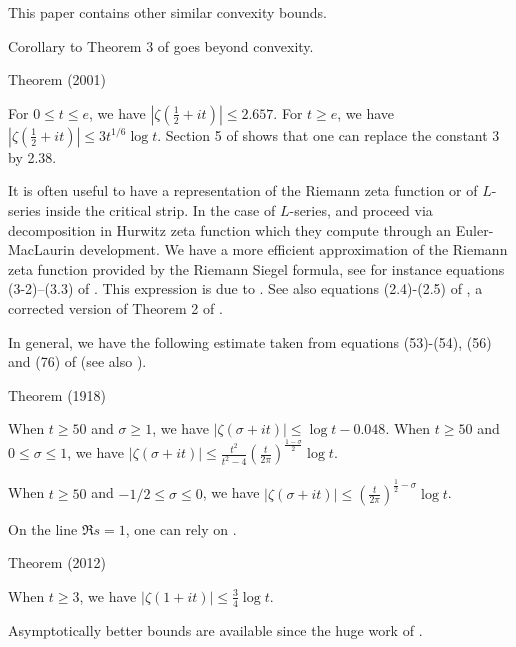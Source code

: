 This paper contains other similar convexity bounds.


Corollary to Theorem 3
of \cite{Cheng-Graham*01} goes beyond convexity. 


\begin{thm}{Theorem (2001)}

  For $0\le t\le e$, we have $|\zeta(\tfrac12+it)|\le 2.657$. For $t\ge e$, we
  have $|\zeta(\tfrac12+it)|\le 3t^{1/6}\log t$.
  Section 5 of \cite{Trudgian*13}
  shows that one can replace the constant 3 by 2.38.
\end{thm}


It is often useful to have a representation of the Riemann zeta function
or of $L$-series inside the critical strip. In the case of $L$-series,
\cite{Spira*69}
and
\cite{Rumely*93}
proceed via decomposition in Hurwitz zeta function which they compute through
an Euler-MacLaurin development. We have a more efficient approximation of the
Riemann zeta function provided by the Riemann Siegel formula, see
for instance equations (3-2)--(3.3)
of \cite{Odlyzko*87}. This
expression is due to 
\cite{Gabcke*79}.
See also 
equations (2.4)-(2.5) of
\cite{Lehman*66}, a corrected
version of Theorem 2 of \cite{Titchmarsh*47}.


In general, we have the following estimate taken from equations
(53)-(54), (56) and (76)
of  \cite{Backlund*18}
(see also \cite{Backlund*14}).

\begin{thm}{Theorem (1918)}

  
  When $t\ge 50$ and $\sigma\ge1$, we have $|\zeta(\sigma+it)|\le \log
  t-0.048$.
   When $t\ge 50$ and $0\le \sigma\le1$, we have $|\zeta(\sigma+it)|\le
  \frac{t^2}{t^2-4}\left(\frac{t}{2\pi}\right)^{\frac{1-\sigma}{2}}\log t$.
  
   When $t\ge 50$ and $-1/2\le \sigma\le0$, we have $|\zeta(\sigma+it)|\le
  \left(\frac{t}{2\pi}\right)^{\frac{1}{2}-\sigma}\log t$.
  
  
\end{thm}



On the line $\Re s=1$, one can rely on
\cite{Trudgian*12b}.

\begin{thm}{Theorem (2012)}

  When $t\ge 3$, we have $|\zeta(1+it)|\le\tfrac34 \log t$.
\end{thm}


Asymptotically better bounds are available since the huge work of
\cite{Ford*02}.

